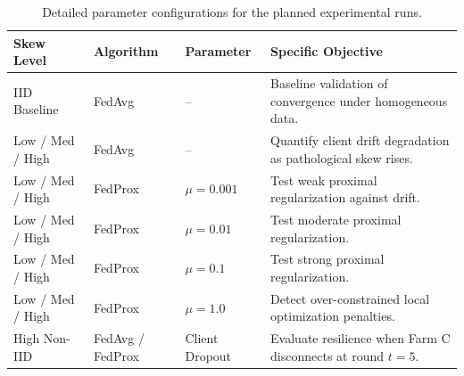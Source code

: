 \documentclass[applsci,article,submit,oneauthor,pdftex]{Definitions/mdpi}
\begin{document}
\begin{table}[H]
\centering
\small
\caption{Detailed parameter configurations for the planned experimental runs.}
\label{tab:param_matrix}
\begin{tabularx}{\textwidth}{P{2.8cm} P{2.2cm} P{2.4cm} Q}
\toprule
\textbf{Skew Level} & \textbf{Algorithm} & \textbf{Parameter} & \textbf{Specific Objective} \\
\midrule
IID Baseline & FedAvg & -- & Baseline validation of convergence under homogeneous data. \\
Low / Med / High & FedAvg & -- & Quantify client drift degradation as pathological skew rises. \\
Low / Med / High & FedProx & $\mu = 0.001$ & Test weak proximal regularization against drift. \\
Low / Med / High & FedProx & $\mu = 0.01$ & Test moderate proximal regularization. \\
Low / Med / High & FedProx & $\mu = 0.1$ & Test strong proximal regularization. \\
Low / Med / High & FedProx & $\mu = 1.0$ & Detect over-constrained local optimization penalties. \\
High Non-IID & FedAvg / FedProx & Client Dropout & Evaluate resilience when Farm C disconnects at round $t=5$. \\
\bottomrule
\end{tabularx}
\end{table}
\end{document}
